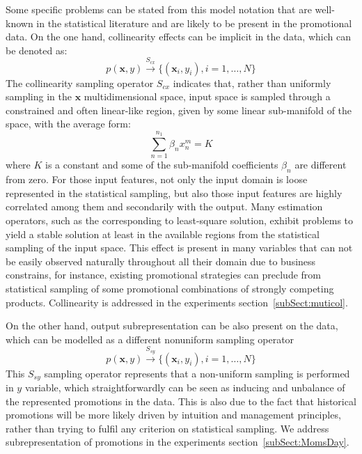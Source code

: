 \documentclass{ieeeaccess}
\begin{document}
Some specific problems can be stated from this model notation that are well-known in the statistical literature and are likely to be present in the promotional data. On the one hand, collinearity effects can be implicit in the data, which can be denoted as:
\begin{equation}
p({\mathbf{x}}, y) \overset{S_{cx}} {\longrightarrow} \{(\mathbf{x}_i, y_i), i=1, \ldots ,N\}
\label{eqn:collinear_sampling}
\end{equation}
The collinearity sampling operator $S_{cx}$ indicates that, rather than uniformly sampling in the $\boldsymbol{x}$ multidimensional space, input space is sampled through a constrained and often linear-like region, given by some linear sub-manifold of the space, with the average form:
\begin{equation}
\sum_{n=1}^{n_1} \beta_n x_n^m  = K
\end{equation}
where $K$ is a constant and some of the sub-manifold coefficients $\beta_n$ are different from zero. For those input features, not only the input domain is loose represented in the statistical sampling, but also those input features are highly correlated among them and secondarily with the output. Many estimation operators, such as the corresponding to least-square solution, exhibit problems to yield a stable solution at least in the available regions from the statistical sampling of the input space. 
This effect is present in many variables that can not be easily observed naturally throughout all their domain due to business constrains, for instance, existing promotional strategies can preclude from statistical sampling of some promotional combinations of strongly competing products. Collinearity is addressed in the experiments section~\ref{subSect:muticol}.

On the other hand, output subrepresentation can be also present on the data, which can be modelled as a different nonuniform sampling operator 
\begin{equation}
p({\mathbf{x}}, y) \overset{S_{sy}} {\longrightarrow} \{(\mathbf{x}_i, y_i), i=1, \ldots ,N\}
\label{eqn:nonuniform_sampling}
\end{equation}
This $S_{sy}$ sampling operator represents that a non-uniform sampling is performed in $y$ variable, which straightforwardly can be seen as inducing and unbalance of the represented promotions in the data. This is also due to the fact that historical promotions will be more likely driven by intuition and management principles, rather than trying to fulfil any criterion on statistical sampling. We address subrepresentation of promotions in the experiments section~\ref{subSect:MomsDay}.
\end{document}

